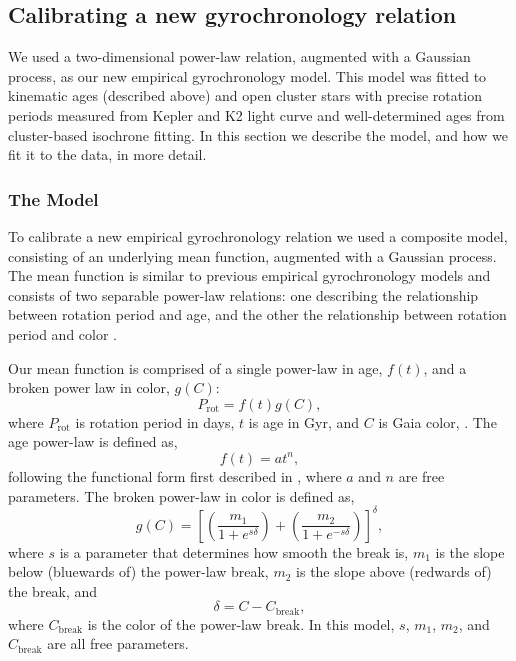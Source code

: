 \subsection{Calibrating a new gyrochronology relation}
\label{sec:calibration}

We used a two-dimensional power-law relation, augmented with a Gaussian
process, as our new empirical gyrochronology model.
This model was fitted to kinematic ages (described above) and open cluster
stars with precise rotation periods measured from Kepler and K2 light curve
and well-determined ages from cluster-based isochrone fitting.
In this section we describe the model, and how we fit it to the data, in more
detail.

\subsubsection{The Model}

To calibrate a new empirical gyrochronology relation
we used a composite model, consisting of an underlying mean function,
augmented with a Gaussian process.
The mean function is similar to previous empirical gyrochronology models and
consists of two separable power-law relations: one describing the relationship
between rotation period and age, and the other the relationship between
rotation period and color \citep[\eg][]{barnes2003, barnes2007, mamajek2008,
meibom2015, angus2015, angus2019}.

Our mean function is comprised of a single power-law in age, $f(t)$, and a
broken power law in color, $g(C)$:
\begin{equation}
P_\mathrm{rot} = f(t) g(C),
\end{equation}
where $P_\mathrm{rot}$ is rotation period in days, $t$ is age in Gyr, and $C$
is Gaia color, \gcolor.
The age power-law is defined as,
\begin{equation}
f(t) = at^n,
\end{equation}
following the functional form first described in \citet{barnes2003}, where $a$
and $n$ are free parameters.
The broken power-law in color is defined as,
\begin{equation}
    g(C) = \left[
\left(\frac{m_1}{1 + e^{s \delta}}\right)
    + \left(\frac{m_2}{1 + e^{-s \delta}}\right)\right]^\delta,
\end{equation}
where $s$ is a parameter that determines how smooth the break is, $m_1$ is the
slope below (bluewards of) the power-law break, $m_2$ is the slope above
(redwards of) the break, and
\begin{equation}
\delta = C - C_\mathrm{break},
\end{equation}
where $C_\mathrm{break}$ is the color of the power-law break.
In this model, $s$, $m_1$, $m_2$, and $C_\mathrm{break}$ are all free
parameters.

